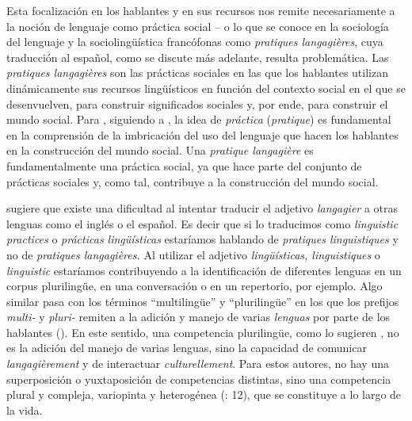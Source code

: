 \documentclass[output=paper]{langscibook}
\begin{document}
Esta focalización en los hablantes y en sus recursos nos remite necesariamente a la noción de lenguaje como práctica social -- o lo que se conoce en la sociología del lenguaje y la sociolingüística francófonas como \textit{pratiques langagières}, cuya traducción al español, como se discute más adelante, resulta problemática. Las \textit{pratiques langagières} son las prácticas sociales en las que los hablantes utilizan dinámicamente sus recursos lingüísticos en función del contexto social en el que se desenvuelven, para construir significados sociales y, por ende, para construir el mundo social. Para \citet{Léglise2018}, siguiendo a   \citet{BoutetEtAl1976}, la idea de \textit{práctica} (\textit{pratique}) es fundamental en la comprensión de la imbricación del uso del lenguaje que hacen los hablantes en la construcción del mundo social. Una \textit{pratique langagière} es fundamentalmente una práctica social, ya que hace parte del conjunto de prácticas sociales y, como tal, contribuye a la construcción del mundo social.

\citet{Léglise2018} sugiere que existe una dificultad al intentar traducir el adjetivo \textit{langagier} a otras lenguas como el inglés o el español. Es decir que si lo traducimos como \textit{linguistic practices} o \textit{prácticas lingüísticas} estaríamos hablando de \textit{pratiques linguistiques} y no de \textit{pratiques langagières.} Al utilizar el adjetivo \textit{lingüísticas, linguistiques} o \textit{linguistic} estaríamos contribuyendo a la identificación de diferentes lenguas en un corpus plurilingüe, en una conversación o en un repertorio, por ejemplo. Algo similar pasa con los términos “multilingüe” y “plurilingüe” en los que los prefijos \textit{multi-} y \textit{pluri-} remiten a la adición y manejo de varias \textit{lenguas} por parte de los hablantes (\citealt{JørgensenEtAl2011,Léglise2018}). En este sentido, una competencia plurilingüe, como lo sugieren   \citet{CosteEtAl1997}, no es la adición del manejo de varias lenguas, sino la capacidad de comunicar \textit{langagièrement} y de interactuar \textit{culturellement}. Para estos autores, no hay una superposición o yuxtaposición de competencias distintas, sino una competencia plural y compleja, variopinta y heterogénea (\citealt{CosteEtAl1997}: 12), que se constituye a lo largo de la vida.
\end{document}

